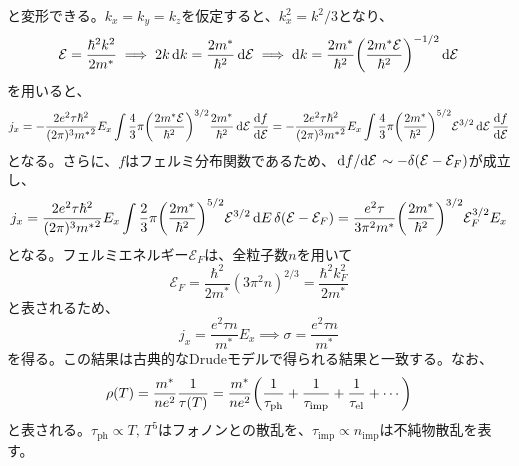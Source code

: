 \documentclass[a4paper,5pt,uplatex]{jsarticle}
\theoremstyle{mystyle} %
\begin{document}
と変形できる。$k_x=k_y=k_z$を仮定すると、$k_x^2 = k^2/3$となり、
\begin{equation}
	\mathcal{E} = \frac{\hbar^2k^2}{2m^*} \implies 2k\dd{k} = \frac{2m^*}{\hbar^2}\dd{\mathcal{E}} \implies \dd{k} = \frac{2m^*}{\hbar^2}\qty(\frac{2m^*\mathcal{E}}{\hbar^2})^{-1/2}\dd{\mathcal{E}}
\end{equation}
を用いると、
\begin{equation}
	j_x = -\frac{2e^2\tau\hbar^2}{(2\pi)^3{m^*}^2}E_x\int\frac{4}{3}\pi{}\qty(\frac{2m^*\mathcal{E}}{\hbar^2})^{3/2}\frac{2m^*}{\hbar^2}\dd{\mathcal{E}}\dv{f}{\mathcal{E}}
	= -\frac{2e^2\tau\hbar^2}{(2\pi)^3{m^*}^2}E_x\int\frac{4}{3}\pi{}\qty(\frac{2m^*}{\hbar^2})^{5/2}\mathcal{E}^{3/2}\dd{\mathcal{E}}\dv{f}{\mathcal{E}}
\end{equation}
となる。さらに、$f$はフェルミ分布関数であるため、$\dv*{f}{\mathcal{E}} \sim -\delta(\mathcal{E}-\mathcal{E}_{F})$が成立し、
\begin{equation}
	j_x = \frac{2e^2\tau\hbar^2}{(2\pi)^3{m^*}^2}E_x\int\frac{2}{3}\pi{}\qty(\frac{2m^*}{\hbar^2})^{5/2}\mathcal{E}^{3/2}\dd{E}\delta(\mathcal{E}-\mathcal{E}_F)
	= \frac{e^2\tau}{3\pi^2{m^*}}\qty(\frac{2m^*}{\hbar^2})^{3/2}\mathcal{E}_F^{3/2}E_x
\end{equation}
となる。フェルミエネルギー$\mathcal{E}_F$は、全粒子数$n$を用いて
\begin{equation}
	\mathcal{E}_F = \frac{\hbar^2}{2m^*}(3\pi^2n)^{2/3} = \frac{\hbar^2k_{F}^2}{2m^*}
\end{equation}
と表されるため、
\begin{equation}
	j_x = \frac{e^2\tau{}n}{m^*}E_x \implies \sigma = \frac{e^2\tau{}n}{m^*}
\end{equation}
を得る。この結果は古典的なDrudeモデルで得られる結果と一致する。なお、
\begin{equation}
	\rho(T) = \frac{m^*}{ne^2}\frac{1}{\tau(T)} = \frac{m^*}{ne^2}\qty(\frac{1}{\tau_{\text{ph}}} + \frac{1}{\tau_{\text{imp}}} + \frac{1}{\tau_{\text{el}}} + \cdots)
\end{equation}
と表される。$\tau_{\text{ph}}\propto T,\,T^5$はフォノンとの散乱を、$\tau_{\text{imp}}\propto n_{\text{imp}}$は不純物散乱を表す。
\end{document}
